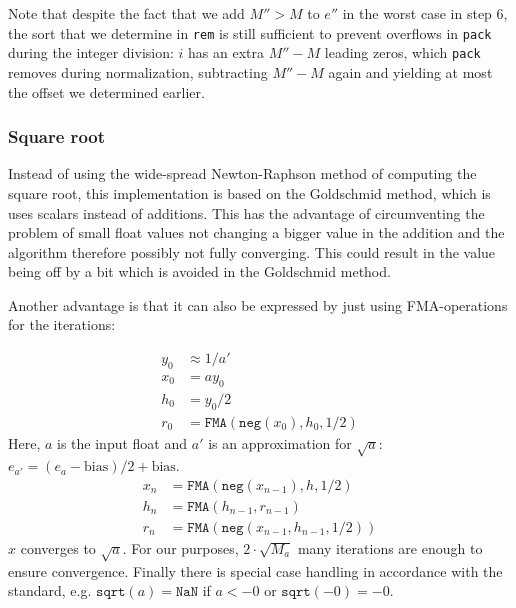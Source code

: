 \documentclass[a4paper,UKenglish,cleveref, autoref, thm-restate]{lipics-v2019}
\begin{document}
Note that despite the fact that we add $M'' > M$ to $e''$ in the worst case in step 6, the sort that we determine in \verb|rem| is still sufficient to prevent overflows in \verb|pack| during the integer division: $i$ has an extra $M'' - M$ leading zeros, which \verb|pack| removes during normalization, subtracting $M'' - M$ again and yielding at most the offset we determined earlier. 

\subsubsection{Square root}
Instead of using the wide-spread Newton-Raphson method of computing the square root, this implementation is based on the Goldschmid method, which is uses scalars instead of additions. This has the advantage of circumventing the problem of small float values not changing a bigger value in the addition and the algorithm therefore possibly not fully converging. This could result in the value being off by a bit which is avoided in the Goldschmid method. 

Another advantage is that it can also be expressed by just using FMA-operations for the iterations:

\begin{align*}
y_0 &\approx 1/a' \\
x_0 &= ay_0 \\
h_0 &= y_0/2 \\
r_0 &= \texttt{FMA}(\texttt{neg}(x_0), h_0, 1/2)
\end{align*}
Here, $a$ is the input float and $a'$ is an approximation for $\sqrt{a}$: $ e_{a'} = (e_a - \text{bias}) / 2 + \text{bias}$.
\begin{align*}
x_n &= \texttt{FMA}(\texttt{neg}(x_{n-1}), h , 1/2)\\
h_n &= \texttt{FMA}(h_{n-1}, r_{n-1})\\
r_n &= \texttt{FMA}(\texttt{neg}(x_{n-1}, h_{n-1}, 1/2))
\end{align*}
$x$ converges to $\sqrt{a}$. For our purposes, $2\cdot\sqrt{M_a}$ many iterations are enough to ensure convergence.
Finally there is special case handling in accordance with the standard, e.g. $\texttt{sqrt}(a) = \texttt{NaN}$ if $a < -0$ or $\texttt{sqrt}(-0) = -0$.
\end{document}
